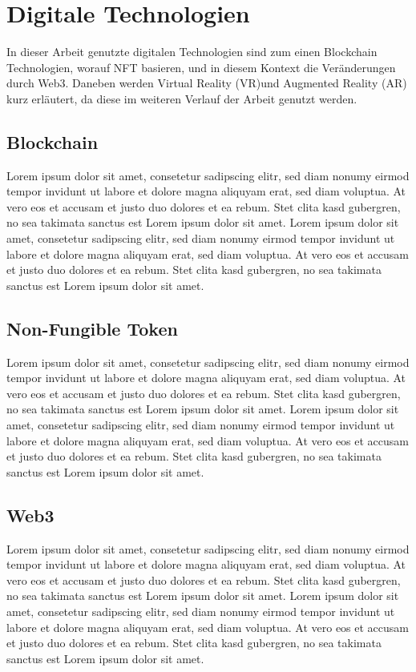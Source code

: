 \section{Digitale Technologien}
In dieser Arbeit genutzte digitalen Technologien sind zum einen Blockchain Technologien, worauf NFT basieren, und in diesem Kontext die Veränderungen durch Web3. Daneben werden Virtual Reality (VR)und Augmented Reality (AR) kurz erläutert, da diese im weiteren Verlauf der Arbeit genutzt werden.
\subsection{Blockchain}
Lorem ipsum dolor sit amet, consetetur sadipscing elitr, sed diam nonumy eirmod tempor invidunt ut labore et dolore magna aliquyam erat, sed diam voluptua. At vero eos et accusam et justo duo dolores et ea rebum. Stet clita kasd gubergren, no sea takimata sanctus est Lorem ipsum dolor sit amet. Lorem ipsum dolor sit amet, consetetur sadipscing elitr, sed diam nonumy eirmod tempor invidunt ut labore et dolore magna aliquyam erat, sed diam voluptua. At vero eos et accusam et justo duo dolores et ea rebum. Stet clita kasd gubergren, no sea takimata sanctus est Lorem ipsum dolor sit amet.

\subsection{Non-Fungible Token}
Lorem ipsum dolor sit amet, consetetur sadipscing elitr, sed diam nonumy eirmod tempor invidunt ut labore et dolore magna aliquyam erat, sed diam voluptua. At vero eos et accusam et justo duo dolores et ea rebum. Stet clita kasd gubergren, no sea takimata sanctus est Lorem ipsum dolor sit amet. Lorem ipsum dolor sit amet, consetetur sadipscing elitr, sed diam nonumy eirmod tempor invidunt ut labore et dolore magna aliquyam erat, sed diam voluptua. At vero eos et accusam et justo duo dolores et ea rebum. Stet clita kasd gubergren, no sea takimata sanctus est Lorem ipsum dolor sit amet.
\subsection{Web3}
Lorem ipsum dolor sit amet, consetetur sadipscing elitr, sed diam nonumy eirmod tempor invidunt ut labore et dolore magna aliquyam erat, sed diam voluptua. At vero eos et accusam et justo duo dolores et ea rebum. Stet clita kasd gubergren, no sea takimata sanctus est Lorem ipsum dolor sit amet. Lorem ipsum dolor sit amet, consetetur sadipscing elitr, sed diam nonumy eirmod tempor invidunt ut labore et dolore magna aliquyam erat, sed diam voluptua. At vero eos et accusam et justo duo dolores et ea rebum. Stet clita kasd gubergren, no sea takimata sanctus est Lorem ipsum dolor sit amet.
